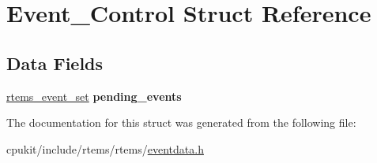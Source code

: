 \hypertarget{structEvent__Control}{}\section{Event\+\_\+\+Control Struct Reference}
\label{structEvent__Control}
\subsection*{Data Fields}
\begin{DoxyCompactItemize}
\item 
\mbox{\label{structEvent__Control_a499fec18fe497e216ed24497e77e6e94}} 
\mbox{\hyperlink{group__ClassicEventSet_gab7b8f373bea85fd4e3b7ae23905faa07}{rtems\+\_\+event\+\_\+set}} {\bfseries pending\+\_\+events}
\end{DoxyCompactItemize}


The documentation for this struct was generated from the following file\+:\begin{DoxyCompactItemize}
\item 
cpukit/include/rtems/rtems/\mbox{\hyperlink{eventdata_8h}{eventdata.\+h}}\end{DoxyCompactItemize}
